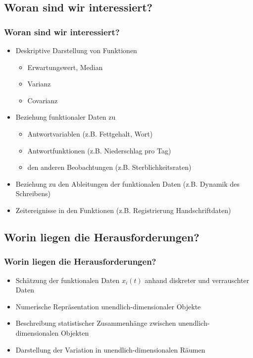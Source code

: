 \documentclass[xcolor=dvipsnames, compress, serif, professionalfont, handout]{beamer}
\begin{document}
\subsection{Woran sind wir interessiert?}
\begin{frame}[fragile]
  \frametitle{Woran sind wir interessiert?}
  \begin{itemize}
    \item<1-> Deskriptive Darstellung von Funktionen
    \begin{itemize}
      \item<1-> Erwartungswert, Median
      \item<1-> Varianz
      \item<1-> Covarianz
    \end{itemize}
    \item<2-> Beziehung funktionaler Daten zu
    \begin{itemize}
      \item<2-> Antwortvariablen (z.B. Fettgehalt, Wort)
      \item<2-> Antwortfunktionen (z.B. Niederschlag pro Tag)
      \item<2-> den anderen Beobachtungen (z.B. Sterblichkeitsraten)
    \end{itemize}
    \item<3-> Beziehung zu den Ableitungen der funktionalen Daten (z.B. Dynamik 
              des Schreibens)
    \item<4-> Zeitereignisse in den Funktionen (z.B. Registrierung 
              Handschriftdaten)
  \end{itemize}
\end{frame}

%
%

\subsection{Worin liegen die Herausforderungen?}
\begin{frame}[fragile]
  \frametitle{Worin liegen die Herausforderungen?}
  \begin{itemize}
    \item<1-> Sch\"atzung der funktionalen Daten $x_i(t)$ anhand diskreter und 
              verrauschter Daten
    \item<2-> Numerische Repr\"asentation unendlich-dimensionaler Objekte
    \item<3-> Beschreibung statistischer Zusammenh\"ange zwischen unendlich-
              dimensionalen Objekten
    \item<4-> Darstellung der Variation in unendlich-dimensionalen R\"aumen
  \end{itemize}
\end{frame}
\end{document}

